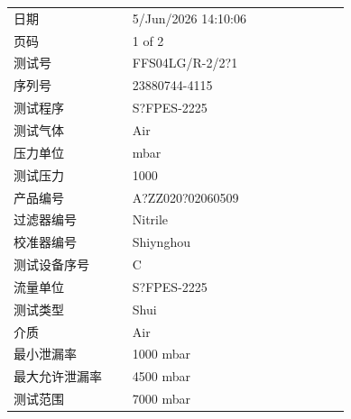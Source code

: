 \documentclass[UTF8,10pt,a4paper,fontset=fandol]{ctexart}
\newcommand{\fieldvalue}[1]{#1}
\begin{document}
\begin{tabular}{@{}p{0.30\linewidth}p{0.55\linewidth}@{}}
日期 &
\fieldvalue{5/Jun/2026 14:10:06}
\\
页码 &
\fieldvalue{1 of 2}
\\
测试号 &
\fieldvalue{FFS04LG/R-2/2?1}
\\
序列号 &
\fieldvalue{23880744-4115}
\\
测试程序 &
\fieldvalue{S?FPES-2225}
\\
测试气体 &
\fieldvalue{Air}
\\
压力单位 &
\fieldvalue{mbar}
\\
测试压力 &
\fieldvalue{1000}
\\
产品编号 &
\fieldvalue{A?ZZ020?02060509}
\\
过滤器编号 &
\fieldvalue{Nitrile}
\\
校准器编号 &
\fieldvalue{Shiynghou}
\\
测试设备序号 &
\fieldvalue{C}
\\
流量单位 &
\fieldvalue{S?FPES-2225}
\\
测试类型 &
\fieldvalue{Shui}
\\
介质 &
\fieldvalue{Air}
\\
最小泄漏率 &
\fieldvalue{1000 mbar}
\\
最大允许泄漏率 &
\fieldvalue{4500 mbar}
\\
测试范围 &
\fieldvalue{7000 mbar}
\\
\end{tabular}

\vspace{1em}
\end{document}
